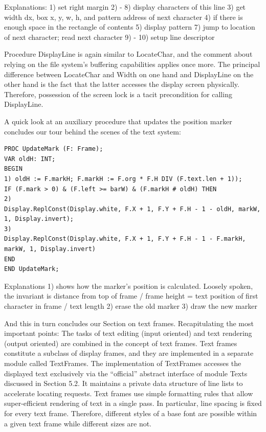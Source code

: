 Explanations:
1) set right margin
2) - 8) display characters of this line
3) get width dx, box x, y, w, h, and pattern address of next character
4) if there is enough space in the rectangle of contents
5) display pattern
7) jump to location of next character; read next character
9) - 10) setup line descriptor

Procedure DisplayLine is again similar to LocateChar, and the comment about relying on the file
system’s buffering capabilities applies once more. The principal difference between LocateChar
and Width on one hand and DisplayLine on the other hand is the fact that the latter accesses the
display screen physically. Therefore, possession of the screen lock is a tacit precondition for calling
DisplayLine.

A quick look at an auxiliary procedure that updates the position marker concludes our tour behind
the scenes of the text system:
\begin{verbatim}
PROC UpdateMark (F: Frame);
VAR oldH: INT;
BEGIN
1) oldH := F.markH; F.markH := F.org * F.H DIV (F.text.len + 1));
IF (F.mark > 0) & (F.left >= barW) & (F.markH # oldH) THEN
2)
Display.ReplConst(Display.white, F.X + 1, F.Y + F.H - 1 - oldH, markW, 1, Display.invert);
3)
Display.ReplConst(Display.white, F.X + 1, F.Y + F.H - 1 - F.markH, markW, 1, Display.invert)
END
END UpdateMark;
\end{verbatim}

Explanations
1) shows how the marker's position is calculated. Loosely spoken, the invariant is
distance from top of frame / frame height = text position of first character in frame / text length
2) erase the old marker
3) draw the new marker

And this in turn concludes our Section on text frames. Recapitulating the most important points: The
tasks of text editing (input oriented) and text rendering (output oriented) are combined in the
concept of text frames. Text frames constitute a subclass of display frames, and they are
implemented in a separate module called TextFrames. The implementation of TextFrames
accesses the displayed text exclusively via the “official” abstract interface of module Texts
discussed in Section 5.2. It maintains a private data structure of line lists to accelerate locating
requests. Text frames use simple formatting rules that allow super-efficient rendering of text in a
single pass. In particular, line spacing is fixed for every text frame. Therefore, different styles of a
base font are possible within a given text frame while different sizes are not.

